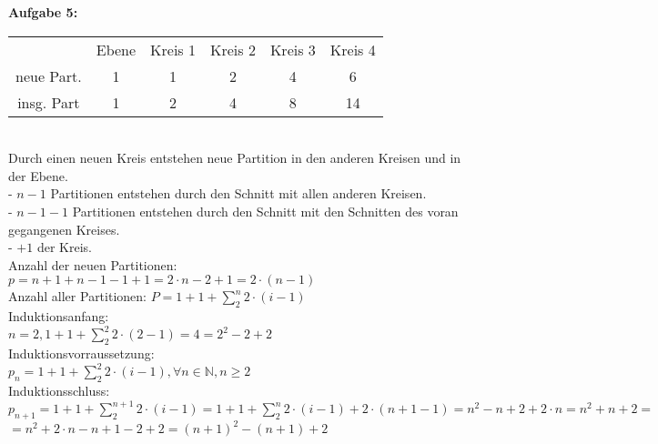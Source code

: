 \documentclass[a4paper]{scrartcl}
\begin{document}
	\begin{flushleft}
		\textbf{Aufgabe 5:}\\	
		\begin{tabular}{|c|c|c|c|c|c|}
			 & Ebene & Kreis 1 & Kreis 2 & Kreis 3 & Kreis 4  \\
			neue Part.& 1 & 1 & 2 & 4 & 6\\
			insg. Part & 1 & 2 & 4 & 8 & 14  \\
		\end{tabular}\\[1em]
		Durch einen neuen Kreis entstehen neue Partition in den anderen Kreisen und in der Ebene.\\
		- $n-1$ Partitionen entstehen durch den Schnitt mit allen anderen Kreisen.\\
		- $n-1-1$ Partitionen entstehen durch den Schnitt mit den Schnitten des voran gegangenen Kreises.\\
		- $+1$ der Kreis.\\[1em]
		Anzahl der neuen Partitionen: $p = n + 1 + n - 1 - 1 + 1=2\cdot n - 2 + 1 = 2\cdot (n -1)$\\
		Anzahl aller Partitionen: $P=1+1+\sum\limits_{2}^{n} 2\cdot (i - 1)$\\
		Induktionsanfang:\\
		$n=2, 1+1+\sum\limits_{2}^{2} 2\cdot (2 - 1) = 4 = 2^2-2+2$\\
		Induktionsvorraussetzung:\\
		$p_n= 1+1+\sum\limits_{2}^{2} 2\cdot (i - 1), \forall n\in \mathbb{N},n\geq 2$\\
		Induktionsschluss:\\
		$p_{n+1}= 1+1+\sum\limits_{2}^{n+1} 2\cdot (i - 1)=1+1+\sum\limits_{2}^{n} 2\cdot (i - 1) + 2\cdot (n + 1 - 1)=n^2-n+2+2\cdot n=n^2+n+2=$\\
		$= n^2 + 2\cdot n -n + 1 - 2 + 2 = (n+1)^2 - (n+1)+2$\\[1em]
	\end{flushleft}
\end{document}
